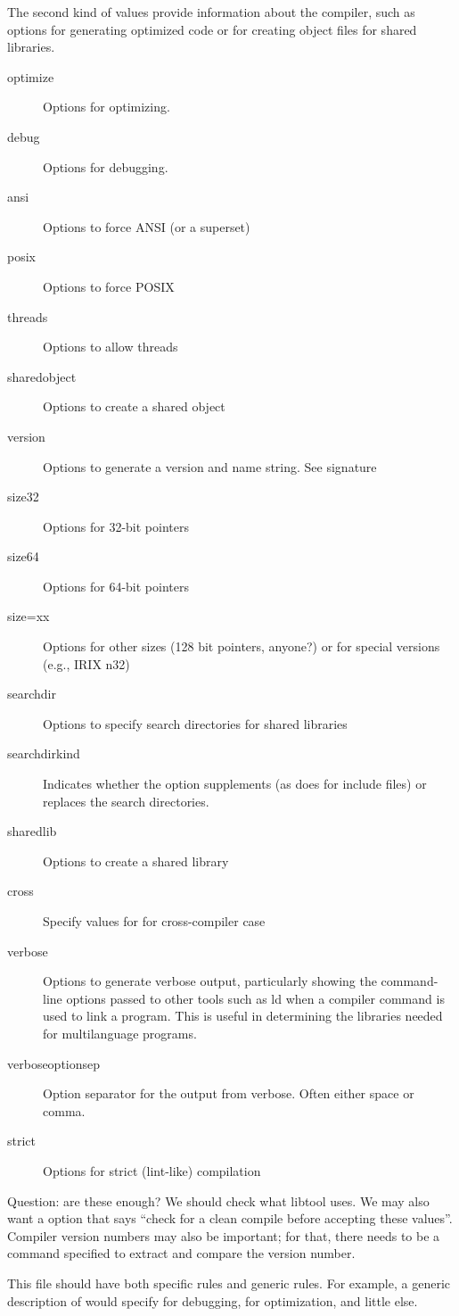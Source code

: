 \documentclass{article}
\begin{document}
The second kind of values provide information about the compiler, such as
options for generating optimized code or for creating object files for shared libraries.
\begin{description}
\item[optimize]Options for optimizing.
\item[debug]Options for debugging.
\item[ansi]Options to force ANSI (or a superset)
\item[posix]Options to force POSIX
\item[threads]Options to allow threads
\item[sharedobject]Options to create a shared object
\item[version]Options to generate a version and name string.  See signature
\item[size32]Options for 32-bit pointers
\item[size64]Options for 64-bit pointers
\item[size=xx]Options for other sizes (128 bit pointers, anyone?) or
for special versions (e.g., IRIX n32)
\item[searchdir]Options to specify search directories for shared
libraries
\item[searchdirkind]Indicates whether the  option
supplements (as  does for include files) or replaces the
search directories.  
\item[sharedlib]Options to create a shared library
\item[cross]Specify values for  for cross-compiler case
\item[verbose]Options to generate verbose output, particularly showing
the command-line options passed to other tools such as ld when a
compiler command is used to link a program.  This is useful in
determining the libraries needed for multilanguage programs.
\item[verboseoptionsep]Option separator for the output from verbose.
Often either space or comma.
\item[strict]Options for strict (lint-like) compilation
\end{description}
Question: are these enough?  We should check what libtool uses.
We may also want a option that says ``check for a clean compile before
accepting these values''.  Compiler version numbers may also be
important; for that, there needs to be a command specified to extract and
compare the version number.

This file should have both specific rules and generic rules.  For
example, a generic description of  would specify 
for debugging,  for optimization, and little else.  
\end{document}
